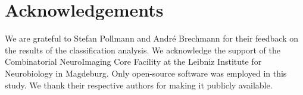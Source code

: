 \section*{Acknowledgements}

We are grateful to Stefan Pollmann and Andr\'e Brechmann for their feedback on
the results of the classification analysis.
%
We acknowledge the support of the Combinatorial NeuroImaging Core
Facility at the Leibniz Institute for Neurobiology in Magdeburg.
%
Only open-source software was employed in this study. We thank their respective
authors for making it publicly available.

\newpage




